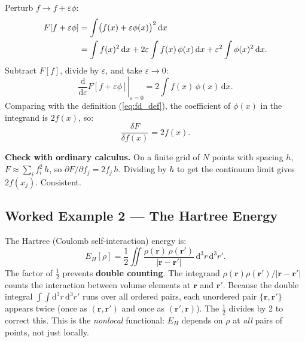 \documentclass[12pt,letterpaper]{article}
\newcommand{\dd}{\mathrm{d}}
\theoremstyle{definition}
\begin{document}
\begin{derivbox}
Perturb $f \to f + \varepsilon\phi$:
\begin{align}
  F[f+\varepsilon\phi]
  &= \int \bigl(f(x)+\varepsilon\phi(x)\bigr)^2\,\dd x \notag\\
  &= \int f(x)^2\,\dd x
     + 2\varepsilon\int f(x)\,\phi(x)\,\dd x
     + \varepsilon^2\int\phi(x)^2\,\dd x.
\end{align}
Subtract $F[f]$, divide by $\varepsilon$, and take $\varepsilon\to 0$:
\begin{equation}
  \left.\frac{\dd}{\dd\varepsilon}F[f+\varepsilon\phi]\right|_{\varepsilon=0}
  = 2\int f(x)\,\phi(x)\,\dd x.
\end{equation}
Comparing with the definition (\ref{eq:fd_def}),
the coefficient of $\phi(x)$ in the integrand is $2f(x)$, so:
\begin{equation}
  \boxed{\frac{\delta F}{\delta f(x)} = 2f(x).}
\end{equation}
\end{derivbox}

\noindent\textbf{Check with ordinary calculus.}
On a finite grid of $N$ points with spacing $h$,
$F \approx \sum_i f_i^2\,h$, so $\partial F/\partial f_j = 2f_j\,h$.
Dividing by $h$ to get the continuum limit gives $2f(x_j)$. Consistent.

\subsection{Worked Example 2 --- The Hartree Energy}

The Hartree (Coulomb self-interaction) energy is:
\begin{equation}
  E_H[\rho] = \frac{1}{2}\iint
    \frac{\rho(\bm{r})\,\rho(\bm{r}')}{|\bm{r}-\bm{r}'|}
    \,\dd^3r\,\dd^3r'.
  \label{eq:hartree}
\end{equation}
The factor of $\tfrac{1}{2}$ prevents \textbf{double counting}.
The integrand $\rho(\bm{r})\rho(\bm{r}')/|\bm{r}-\bm{r}'|$ counts the
interaction between volume elements at $\bm{r}$ and $\bm{r}'$.
Because the double integral $\int\!\int\!\dd^3r\,\dd^3r'$ runs over
all ordered pairs, each unordered pair $\{\bm{r},\bm{r}'\}$ appears
twice (once as $(\bm{r},\bm{r}')$ and once as $(\bm{r}',\bm{r})$).
The $\tfrac{1}{2}$ divides by 2 to correct this.
This is the \emph{nonlocal} functional: $E_H$ depends on $\rho$ at
\emph{all} pairs of points, not just locally.
\end{document}
